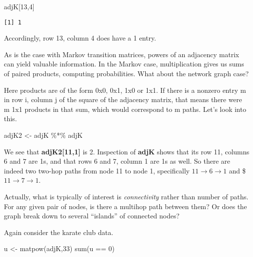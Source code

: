 \documentclass[
  letterpaper,
  DIV=11,
  numbers=noendperiod,
  oneside]{scrreprt}
\newenvironment{Shaded}{\begin{snugshade}}{\end{snugshade}}
\newcommand{\DecValTok}[1]{\textcolor[rgb]{0.68,0.00,0.00}{#1}}
\newcommand{\FunctionTok}[1]{\textcolor[rgb]{0.28,0.35,0.67}{#1}}
\newcommand{\NormalTok}[1]{\textcolor[rgb]{0.00,0.23,0.31}{#1}}
\newcommand{\OtherTok}[1]{\textcolor[rgb]{0.00,0.23,0.31}{#1}}
\newcommand{\SpecialCharTok}[1]{\textcolor[rgb]{0.37,0.37,0.37}{#1}}
\begin{document}
\begin{Shaded}
\begin{Highlighting}[]
\NormalTok{adjK[}\DecValTok{13}\NormalTok{,}\DecValTok{4}\NormalTok{]}
\end{Highlighting}
\end{Shaded}

\begin{verbatim}
[1] 1
\end{verbatim}

Accordingly, row 13, column 4 does have a 1 entry.

As is the case with Markov transition matrices, powers of an adjacency
matrix can yield valuable information. In the Markov case,
multiplication gives us sums of paired products, computing
probabilities. What about the network graph case?

Here products are of the form 0x0, 0x1, 1x0 or 1x1. If there is a
nonzero entry m in row i, column j of the square of the adjacency
matrix, that means there were m 1x1 products in that sum, which would
correspond to m paths. Let's look into this.

\begin{Shaded}
\begin{Highlighting}[]
\NormalTok{adjK2 }\OtherTok{\textless{}{-}}\NormalTok{ adjK }\SpecialCharTok{\%*\%}\NormalTok{ adjK}
\end{Highlighting}
\end{Shaded}

We see that \textbf{adjK2{[}11,1{]}} is 2. Inspection of \textbf{adjK}
shows that its row 11, columns 6 and 7 are 1s, and that rows 6 and 7,
column 1 are 1s as well. So there are indeed two two-hop paths from node
11 to node 1, specifically \(11 \rightarrow 6 \rightarrow 1\) and \$
\(11 \rightarrow 7 \rightarrow 1\).

Actually, what is typically of interest is \emph{connectivity} rather
than number of paths. For any given pair of nodes, is there a multihop
path between them? Or does the graph break down to several ``islands''
of connected nodes?

Again consider the karate club data.

\begin{Shaded}
\begin{Highlighting}[]
\NormalTok{u }\OtherTok{\textless{}{-}} \FunctionTok{matpow}\NormalTok{(adjK,}\DecValTok{33}\NormalTok{)}
\FunctionTok{sum}\NormalTok{(u }\SpecialCharTok{==} \DecValTok{0}\NormalTok{)}
\end{Highlighting}
\end{Shaded}
\end{document}
